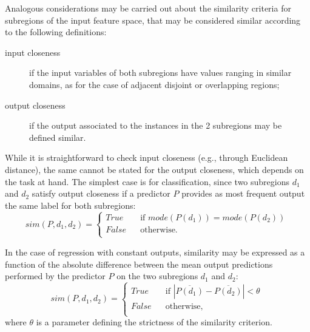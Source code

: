\documentclass[
]{ceurart}
\begin{document}
Analogous considerations may be carried out about the similarity criteria for subregions of the input feature space, that may be considered similar according to the following definitions:
%
\begin{description}
	\item[input closeness] if the input variables of both subregions have values ranging in similar domains, as for the case of adjacent disjoint or overlapping regions;
	\item [output closeness] if the output associated to the instances in the 2 subregions may be defined similar.
\end{description}
%
While it is straightforward to check input closeness (e.g., through Euclidean distance), the same cannot be stated for the output closeness, which depends on the task at hand.
%
The simplest case is for classification, since two subregions $d_1$ and $d_2$ satisfy output closeness if a predictor $P$ provides as most frequent output the same label for both subregions:
%
\begin{equation}
	sim(P, d_1, d_2) = 
	\begin{cases}
		True \text{~~~~~~if~} mode(P(d_1)) = mode(P(d_2))\\
		False \text{~~~~~otherwise}.\\
	\end{cases}\,\label{eq:simClass}
\end{equation}

In the case of regression with constant outputs, similarity may be expressed as a function of the absolute difference between the mean output predictions performed by the predictor $P$ on the two subregions $d_1$ and $d_2$:
%
\begin{equation}
	sim(P, d_1, d_2) = 
	\begin{cases}
		True \text{~~~~~~if~} |\overline{P(d_1)} - \overline{P(d_2)}| < \theta\\
		False \text{~~~~~otherwise},\\
	\end{cases}\,\label{eq:simRegK}
\end{equation}
%
where $\theta$ is a parameter defining the strictness of the similarity criterion.
\end{document}
